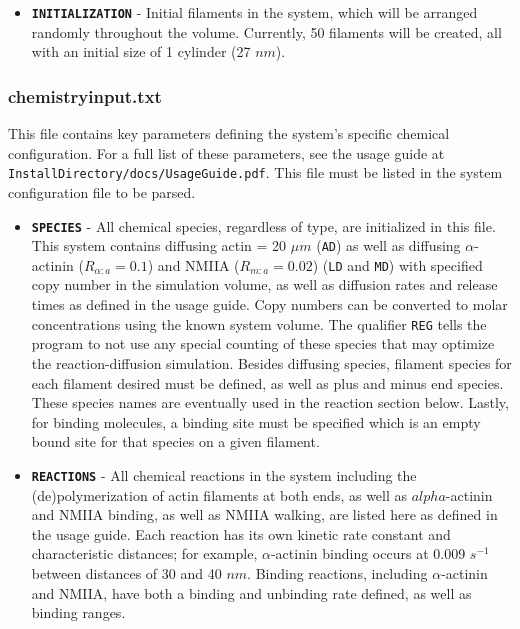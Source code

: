 \documentclass[11pt, oneside]{article}   	%
\begin{document}
\begin{itemize}
\item \texttt{\textbf{INITIALIZATION}} - Initial filaments in the system, which will be arranged randomly throughout the volume. Currently, 50 filaments will be created, all with an initial size of 1 cylinder (27 $nm$).

\end{itemize}

\subsubsection{chemistryinput.txt}

This file contains key parameters defining the system's specific chemical configuration. For a full list of these parameters, see the usage guide at \texttt{InstallDirectory/docs/UsageGuide.pdf}. This file must be listed in the system configuration file to be parsed.

\begin{itemize}

\item \texttt{\textbf{SPECIES}} - All chemical species, regardless of type, are initialized in this file. This system contains diffusing actin = 20 $\mu m$ (\texttt{AD}) as well as diffusing $\alpha$-actinin ($R_{\alpha:a}=0.1$) and NMIIA  ($R_{m:a}=0.02$) (\texttt{LD} and \texttt{MD}) with specified copy number in the simulation volume, as well as diffusion rates and release times as defined in the usage guide. Copy numbers can be converted to molar concentrations using the known system volume. The qualifier \texttt{REG} tells the program to not use any special counting of these species that may optimize the reaction-diffusion simulation. Besides diffusing species, filament species for each filament desired must be defined, as well as plus and minus end species. These species names are eventually used in the reaction section below. Lastly, for binding molecules, a binding site must be specified which is an empty bound site for that species on a given filament.

\item \texttt{\textbf{REACTIONS}} - All chemical reactions in the system including the (de)polymerization of actin filaments at both ends, as well as $alpha$-actinin and NMIIA binding, as well as NMIIA walking, are listed here as defined in the usage guide. Each reaction has its own kinetic rate constant and characteristic distances; for example, $\alpha$-actinin binding occurs at 0.009 $s^{-1}$ between distances of 30 and 40 $nm$. Binding reactions, including $\alpha$-actinin and NMIIA, have both a binding and unbinding rate defined, as well as binding ranges.

\end{itemize}
\end{document}

